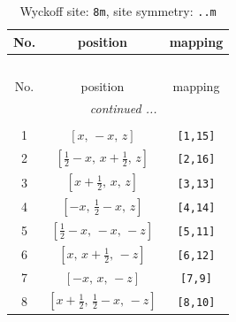 \documentclass[fleqn,8pt]{jsarticle}
\begin{document}
\begin{longtable}{ccc}
\caption{Wyckoff site: {\tt 8m}, site symmetry: {\tt ..m}}
 \\
 \hline \hline
No. & position & mapping \\ \hline \endfirsthead

\multicolumn{2}{l}{\tablename\ \thetable{}} \\
 \hline \hline
No. & position & mapping \\ \hline \endhead

 \hline \hline
\multicolumn{2}{r}{\footnotesize\it continued ...} \\ \endfoot

 \hline \hline
\multicolumn{2}{r}{} \\ \endlastfoot

1 & $\left[ x,\, - x,\, z \right]$ & {\tt [1,15]} \\ \hline
2 & $\left[ \frac{1}{2} - x,\, x + \frac{1}{2},\, z \right]$ & {\tt [2,16]} \\ \hline
3 & $\left[ x + \frac{1}{2},\, x,\, z \right]$ & {\tt [3,13]} \\ \hline
4 & $\left[ - x,\, \frac{1}{2} - x,\, z \right]$ & {\tt [4,14]} \\ \hline
5 & $\left[ \frac{1}{2} - x,\, - x,\, - z \right]$ & {\tt [5,11]} \\ \hline
6 & $\left[ x,\, x + \frac{1}{2},\, - z \right]$ & {\tt [6,12]} \\ \hline
7 & $\left[ - x,\, x,\, - z \right]$ & {\tt [7,9]} \\ \hline
8 & $\left[ x + \frac{1}{2},\, \frac{1}{2} - x,\, - z \right]$ & {\tt [8,10]} \\
\end{longtable}
\renewcommand{\arraystretch}{1.2}
\end{document}
